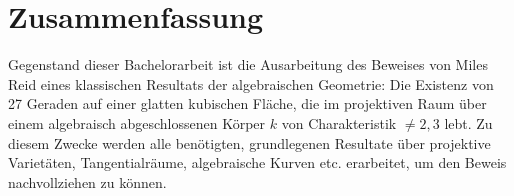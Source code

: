 \documentclass[12pt,a4paper,twoside]{article}
\begin{document}
\pagestyle{empty}


\section*{Zusammenfassung}

Gegenstand dieser Bachelorarbeit ist die Ausarbeitung des Beweises von Miles Reid eines klassischen Resultats der algebraischen Geometrie: Die Existenz von 27 Geraden auf einer glatten kubischen Fläche, die im projektiven Raum über einem algebraisch abgeschlossenen Körper $k$ von Charakteristik $\neq 2,3$ lebt.
Zu diesem Zwecke werden alle benötigten, grundlegenen Resultate über projektive Varietäten, Tangentialräume, algebraische Kurven etc. erarbeitet, um den Beweis nachvollziehen zu können.

\newpage
\tableofcontents

\newpage

\pagestyle{headings}


% 
















\end{document}
